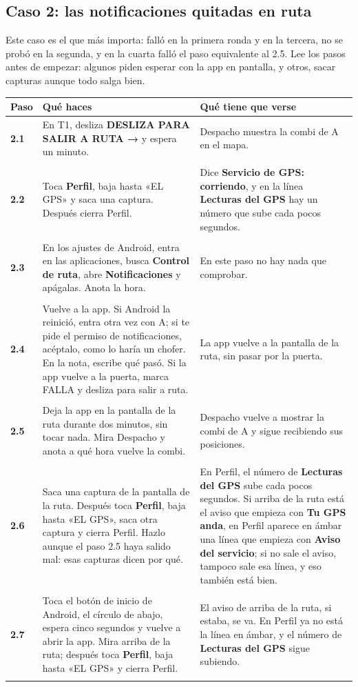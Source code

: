 \documentclass[10pt,a4paper]{article}
\makeatletter
\newcommand{\toca}[1]{\textcolor{azul}{\textbf{#1}}}
\newcommand{\pantalla}[1]{\textcolor{marron}{\textbf{#1}}}
\newcommand{\nada}{\textcolor{tenue}{En este paso no hay nada que comprobar.}}
\newcommand{\caja}[2]{\hbox{\vrule height #1 depth 0pt width 0pt #2}}
\newcommand{\campo}[3]{%
  \raisebox{-0.35\height}{\caja{#3}{\TextField[name=#1, width=#2, height=#3, charsize=8pt, bordercolor={0.55 0.6 0.68},
    backgroundcolor={0.965 0.976 0.992}, multiline=true]{}}}}
\newcommand{\resultado}[1]{%
  \caja{9pt}{\ChoiceMenu[radio, name=resultado-#1, width=9pt, height=9pt, radiosymbol=l,
    bordercolor={0.35 0.38 0.45}, default=]{}{OK=ok,FALLA=falla,NO SE PUDO=nopudo}}}
\newcommand{\paso}[4]{%
  \textbf{#1} & #3 & #4 \\*
  \multicolumn{3}{@{\hspace{6pt}}l@{}}{\rule{0pt}{15pt}\small
    \resultado{#2}\hspace{0.4em}Hora:~\campo{hora-#2}{1.7cm}{13pt}\hspace{1.2em}Nota:~\campo{nota-#2}{8.3cm}{22pt}}\\[3pt]
  \hline
}
\newenvironment{pasos}{%
  \begin{longtable}{@{\hspace{6pt}}>{\raggedright\arraybackslash}p{0.9cm}>{\raggedright\arraybackslash}p{7.9cm}>{\raggedright\arraybackslash}p{7.3cm}@{}}
  \rowcolor{cabecera}\textbf{Paso} & \textbf{Qué haces} & \textbf{Qué tiene que verse} \\ \hline
  \endhead
}{\end{longtable}\vspace{-0.6em}}
\makeatother
\begin{document}
\begin{Form}
\section{Caso 2: las notificaciones quitadas en ruta}

Este caso es el que más importa: falló en la primera ronda y en la tercera, no se probó en la segunda, y en la cuarta falló el paso equivalente al 2.5. Lee los pasos antes de empezar: algunos piden esperar con la app en pantalla, y otros, sacar capturas aunque todo salga bien.

\begin{pasos}
\paso{2.1}{2-1}{En T1, desliza \toca{DESLIZA PARA SALIR A RUTA →} y espera un minuto.}{Despacho muestra la combi de A en el mapa.}
\paso{2.2}{2-2}{Toca \toca{Perfil}, baja hasta «EL GPS» y saca una captura. Después cierra Perfil.}{Dice \pantalla{Servicio de GPS: corriendo}, y en la línea \pantalla{Lecturas del GPS} hay un número que sube cada pocos segundos.}
\paso{2.3}{2-3}{En los ajustes de Android, entra en las aplicaciones, busca \toca{Control de ruta}, abre \toca{Notificaciones} y apágalas. Anota la hora.}{\nada}
\paso{2.4}{2-4}{Vuelve a la app. Si Android la reinició, entra otra vez con A; si te pide el permiso de notificaciones, acéptalo, como lo haría un chofer. En la nota, escribe qué pasó. Si la app vuelve a la puerta, marca FALLA y desliza para salir a ruta.}{La app vuelve a la pantalla de la ruta, sin pasar por la puerta.}
\paso{2.5}{2-5}{Deja la app en la pantalla de la ruta durante dos minutos, sin tocar nada. Mira Despacho y anota a qué hora vuelve la combi.}{Despacho vuelve a mostrar la combi de A y sigue recibiendo sus posiciones.}
\paso{2.6}{2-6}{Saca una captura de la pantalla de la ruta. Después toca \toca{Perfil}, baja hasta «EL GPS», saca otra captura y cierra Perfil. Hazlo aunque el paso 2.5 haya salido mal: esas capturas dicen por qué.}{En Perfil, el número de \pantalla{Lecturas del GPS} sube cada pocos segundos. Si arriba de la ruta está el aviso que empieza con \pantalla{Tu GPS anda}, en Perfil aparece en ámbar una línea que empieza con \pantalla{Aviso del servicio}; si no sale el aviso, tampoco sale esa línea, y eso también está bien.}
\paso{2.7}{2-7}{Toca el botón de inicio de Android, el círculo de abajo, espera cinco segundos y vuelve a abrir la app. Mira arriba de la ruta; después toca \toca{Perfil}, baja hasta «EL GPS» y cierra Perfil.}{El aviso de arriba de la ruta, si estaba, se va. En Perfil ya no está la línea en ámbar, y el número de \pantalla{Lecturas del GPS} sigue subiendo.}

\end{pasos}
\end{Form}
\end{document}
